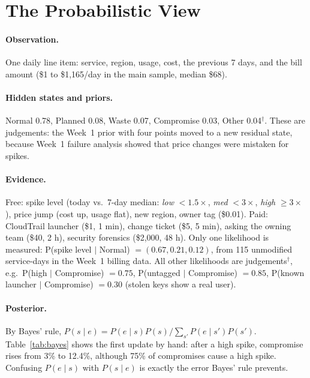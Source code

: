 \documentclass{article}
\newcommand{\hyp}{$^{\dagger}$}
\begin{document}
\section{The Probabilistic View}
\label{sec:prob}

\paragraph{Observation.} One daily line item: service, region, usage, cost, the previous 7 days, and the bill amount (\$1 to \$1,165/day in the main sample, median \$68).

\paragraph{Hidden states and priors.} Normal 0.78, Planned 0.08, Waste 0.07, Compromise 0.03, Other 0.04\hyp. These are judgements: the Week~1 prior with four points moved to a new residual state, because Week~1 failure analysis showed that price changes were mistaken for spikes.

\paragraph{Evidence.} Free: spike level (today vs.\ 7-day median: \emph{low} $<1.5\times$, \emph{med} $<3\times$, \emph{high} $\geq 3\times$), price jump (cost up, usage flat), new region, owner tag (\$0.01). Paid: CloudTrail launcher (\$1, 1 min), change ticket (\$5, 5 min), asking the owning team (\$40, 2 h), security forensics (\$2,000, 48 h). Only one likelihood is measured: P(spike level $\mid$ Normal) $=(0.67, 0.21, 0.12)$, from 115 unmodified service-days in the Week~1 billing data. All other likelihoods are judgements\hyp, e.g.\ P(high $\mid$ Compromise) $=0.75$, P(untagged $\mid$ Compromise) $=0.85$, P(known launcher $\mid$ Compromise) $=0.30$ (stolen keys show a real user).

\paragraph{Posterior.} By Bayes' rule, $P(s \mid e) = P(e \mid s)P(s) / \sum_{s'} P(e \mid s')P(s')$. Table~\ref{tab:bayes} shows the first update by hand: after a high spike, compromise rises from 3\% to 12.4\%, although 75\% of compromises cause a high spike. Confusing $P(e\mid s)$ with $P(s\mid e)$ is exactly the error Bayes' rule prevents.
\end{document}
